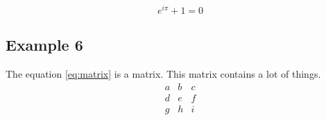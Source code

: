 \documentclass[a4paper,11pt]{article}
\begin{document}
\begin{equation}
\label{eq:euler}
e^{i\pi} + 1 = 0
\end{equation}

\subsection{Example 6}

The equation \eqref{eq:matrix} is a matrix. This matrix contains
a lot of things.
\begin{equation}
\label{eq:matrix}
\begin{matrix}
    a & b & c \\ d & e & f \\ g & h & i
\end{matrix}
\end{equation}
\end{document}
